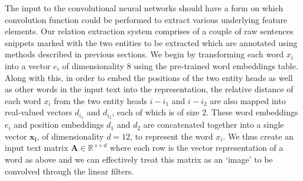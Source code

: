 
The input to the convolutional neural networks should have a form on which convolution function could be performed to extract various underlying feature elements. Our relation extraction system comprises of a couple of raw sentences snippets marked with the two entities to be extracted which are annotated using methods described in previous sections. We begin by transforming each word $x_i$ into a vector $e_i$ of dimensionality $8$ using the pre-trained word embeddings table. Along with this, in order to embed the positions of the two entity heads as well as other words in the input text into the representation, the relative distance of each word $x_i$ from the two entity heads $i-i_1$ and $i-i_2$ are also mapped into real-valued vectors $d_{i_{1}}$ and $d_{i_{2}}$, each of which is of size $2$. These word embeddings $e_i$ and position embeddings $d_1$ and $d_2$ are concatenated together into a single vector $\mathbf{x_i}$, of dimensionality $d=12$, to represent the word $x_i$. We thus create an input text matrix $\mathbf{A} \in \mathbb{R}^{\,s\times d}$ where each row is the vector representation of a word as above and we can effectively treat this matrix as an `image' to be convolved through the linear filters. 

